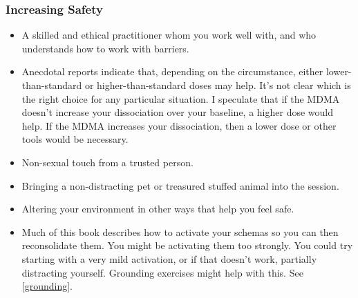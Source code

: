 \documentclass[11pt,oneside]{book}
\begin{document}
\subsubsection*{Increasing Safety}
\begin{itemize}
	\item A skilled and ethical practitioner whom you work well with, and who understands how to work with barriers.
	\item Anecdotal reports indicate that, depending on the circumstance, either lower-than-standard or higher-than-standard doses may help. It's not clear which is the right choice for any particular situation. I speculate that if the MDMA doesn't increase your dissociation over your baseline, a higher dose would help. If the MDMA increases your dissociation, then a lower dose or other tools would be necessary.
	\item Non-sexual touch from a trusted person.
	\item Bringing a non-distracting pet or treasured stuffed animal into the session.
	\item Altering your environment in other ways that help you feel safe.
	\item Much of this book describes how to activate your schemas so you can then reconsolidate them. You might be activating them too strongly. You could try starting with a very mild activation, or if that doesn't work, partially distracting yourself. Grounding exercises might help with this. See \cref{grounding}.
\end{itemize}
\end{document}
